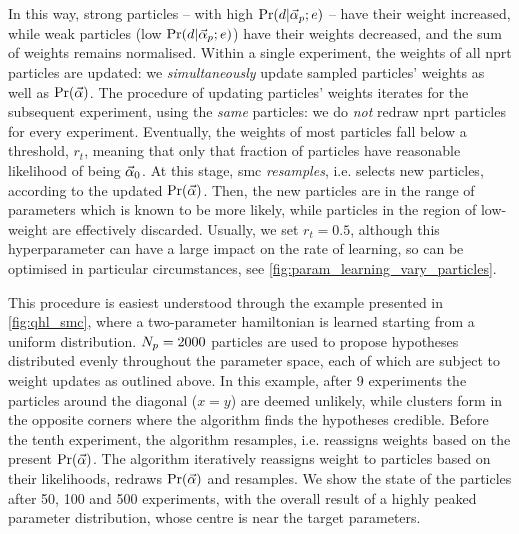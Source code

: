 In this way, strong \glspl{particle} -- with high $\Pr(d | \vec{\alpha}_p; e)$ -- have their weight increased, 
    while weak \glspl{particle} (low $\Pr(d | \vec{\alpha}_p; e)$) have their weights decreased, 
    and the sum of weights remains normalised. 
Within a single experiment, the weights of all \gls{nprt} \glspl{particle} are updated:
    we \emph{simultaneously} update sampled \glspl{particle}' weights as well as $\Pr(\vec{\alpha})$. 
The procedure of updating \glspl{particle}' weights iterates for the subsequent experiment, using the \emph{same} \glspl{particle}: 
    we do \emph{not} redraw \gls{nprt} \glspl{particle} for every experiment.
Eventually, the weights of most \glspl{particle} fall below a threshold, $r_t$, 
    meaning that only that fraction of \glspl{particle} have reasonable \gls{likelihood} of being $\vec{\alpha}_0$.
At this stage, \gls{smc} \emph{resamples}\footnotemark, i.e. selects new \glspl{particle}, according to the updated $\Pr(\vec{\alpha})$.
Then, the new \glspl{particle} are in the range of parameters which is known to be more likely, 
    while \glspl{particle} in the region of low-weight are effectively discarded. 
Usually, we set $r_t=0.5$, although this \gls{hyperparameter} can have a large impact 
    on the rate of learning, so can be optimised in particular circumstances, 
    see \cref{fig:param_learning_vary_particles}.
\par 
This procedure is easiest understood through the example presented in \cref{fig:qhl_smc}, 
    where a two-parameter \gls{hamiltonian} is learned starting from a uniform distribution. 
$N_p=2000$ \glspl{particle} are used to propose hypotheses distributed evenly throughout the parameter space, 
    each of which are subject to weight updates as outlined above. 
In this example, after 9 \glspl{experiment} the \glspl{particle} around the diagonal ($x=y$) are deemed unlikely, 
    while clusters form in the opposite corners where the algorithm finds the hypotheses credible. 
Before the tenth experiment, the algorithm resamples, i.e. reassigns weights based on the present $\Pr(\vec{\alpha})$. 
The algorithm iteratively reassigns weight to \glspl{particle} based on their likelihoods, redraws $\Pr(\vec{\alpha})$ and resamples. 
We show the state of the \glspl{particle} after 50, 100 and 500 \glspl{experiment},
    with the overall result of a highly peaked parameter distribution, 
    whose centre is near the target parameters. 


